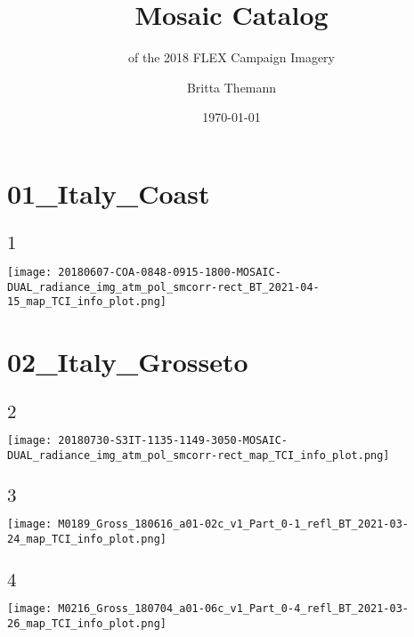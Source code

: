 \documentclass[9pt]{beamer}
\title{Mosaic Catalog}
\subtitle{of the 2018 FLEX Campaign Imagery}
\author{Britta Themann}
\institute{ESA-ESRIN}
\date{\today}
\begin{document}
\begin{frame}
\titlepage
\end{frame}

\section{01\_Italy\_Coast}

\subsection{$1$}
\begin{frame}
\begin{center}
\texttt{[image: 20180607-COA-0848-0915-1800-MOSAIC-DUAL\_radiance\_img\_atm\_pol\_smcorr-rect\_BT\_2021-04-15\_map\_TCI\_info\_plot.png]}
\end{center}
\end{frame}
\section{02\_Italy\_Grosseto}

\subsection{$2$}
\begin{frame}
\begin{center}
\texttt{[image: 20180730-S3IT-1135-1149-3050-MOSAIC-DUAL\_radiance\_img\_atm\_pol\_smcorr-rect\_map\_TCI\_info\_plot.png]}
\end{center}
\end{frame}

\subsection{$3$}
\begin{frame}
\begin{center}
\texttt{[image: M0189\_Gross\_180616\_a01-02c\_v1\_Part\_0-1\_refl\_BT\_2021-03-24\_map\_TCI\_info\_plot.png]}
\end{center}
\end{frame}

\subsection{$4$}
\begin{frame}
\begin{center}
\texttt{[image: M0216\_Gross\_180704\_a01-06c\_v1\_Part\_0-4\_refl\_BT\_2021-03-26\_map\_TCI\_info\_plot.png]}
\end{center}
\end{frame}
\end{document}
